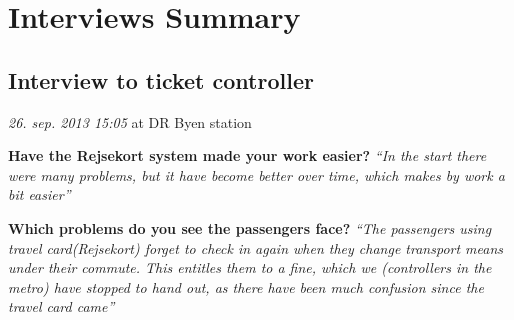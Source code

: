 \renewcommand{\headrulewidth}{0.1pt}
\renewcommand{\footrulewidth}{0.1pt}

\section*{Interviews Summary}

\subsection*{Interview to ticket controller}
\textit{26. sep. 2013 15:05} at DR Byen station

\textbf{Have the Rejsekort system made your work easier?}
\textit{“In the start there were many problems, but it have become better over time, which makes by work a bit easier”}

\textbf{Which problems do you see the passengers face?}
\textit{“The passengers using travel card(Rejsekort) forget to check in again when they change transport means under their commute. This entitles them to a fine, which we (controllers in the metro) have stopped to hand out, as there have been much confusion since the travel card came”}



